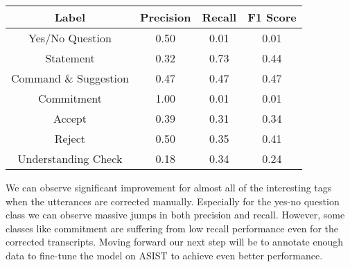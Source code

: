 \begin{center}
\begin{tabular}{||c c c c||}
 \hline
 Label & Precision & Recall & F1 Score\\ [0.5ex]
 \hline\hline
 Yes/No Question & 0.50 & 0.01 & 0.01\\
 \hline
 Statement & 0.32 & 0.73 & 0.44\\
 \hline
 Command \& Suggestion & 0.47 & 0.47 & 0.47\\
 \hline
 Commitment & 1.00 & 0.01 & 0.01\\
 \hline
 Accept & 0.39 & 0.31 &  0.34 \\
 \hline
  Reject & 0.50 & 0.35 & 0.41\\
 \hline
  Understanding Check & 0.18 & 0.34 & 0.24\\
 \hline
\end{tabular}
\end{center}

We can observe significant improvement for almost all of the interesting tags when the
utterances are corrected manually. Especially for the yes-no question class we can 
observe massive jumps in both precision and recall. However, some classes like commitment
are suffering from low recall performance even for the corrected transcripts. Moving forward
our next step will be to annotate enough data to fine-tune the model on ASIST to achieve
even better performance.

